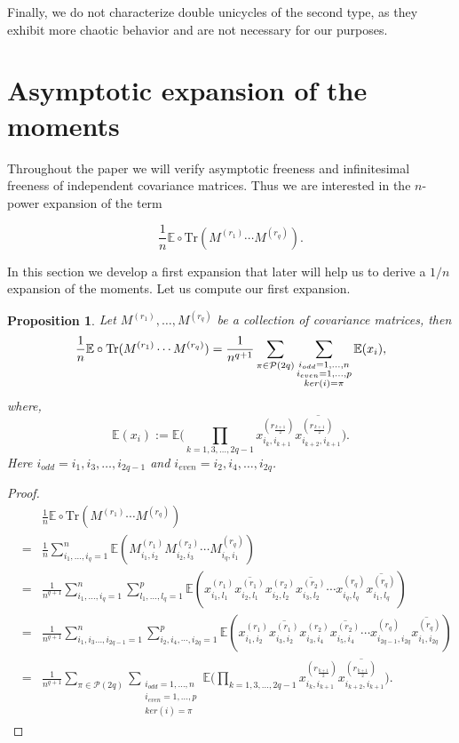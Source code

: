 \documentclass{article}
\newtheorem{proposition}[theorem]{Proposition}
\theoremstyle{definition}
\newcommand{\E}{\mathbb{E}}
\newcommand{\cP}{\mathcal{P}}
\newcommand{\Tr}{\text{Tr}}
\begin{document}
{Finally, we do not characterize double unicycles of the second type, as they exhibit more chaotic behavior and are not necessary for our purposes.

\section{Asymptotic expansion of the moments}\label{Section: Asymptotic expansion of the moments}

Throughout the paper we will verify asymptotic freeness and infinitesimal freeness of independent covariance matrices. Thus we are interested in the $n$-power expansion of the term

$$\frac{1}{n} \E \circ \Tr(M^{(r_1)}\cdots M^{(r_q)}).$$

In this section we develop a first expansion that later will help us to derive a $1/n$ expansion of the moments. Let us compute our first expansion.

\begin{proposition}\label{Proposition: Expansion of moments 1}
Let $M^{(r_1)},\dots,M^{(r_q)}$ be a collection of covariance matrices, then
\begin{equation}
\frac{1}{n} \E \circ \textup{\Tr}(M^{(r_1)}\cdots M^{(r_q)})=\frac{1}{n^{q+1}}\sum_{\pi\in \cP(2q)}\sum_{\substack{i_{odd}=1,\dots,n \\ i_{even}=1,\dots,p \\ ker(i)=\pi}}\E(x_i),
\end{equation}
where,
$$\E(x_i) := \E\Bigg(\prod_{k=1,3,\dots,2q-1}x_{i_k,i_{k+1}}^{(r_{\frac{k+1}{2}})}\overline{x_{i_{k+2},i_{k+1}}^{(r_{\frac{k+1}{2}})}}\Bigg).$$
Here $i_{odd}=i_1,i_3,\dots,i_{2q-1}$ and $i_{even}=i_2,i_4,\dots,i_{2q}$.
\end{proposition}
\begin{proof}
\begin{eqnarray*}
&&\frac{1}{n} \E \circ \Tr(M^{(r_1)}\cdots M^{(r_q)}) \\
&=& \frac{1}{n} \sum_{i_1,\dots ,i_q=1}^n \E(M^{(r_1)}_{i_1,i_2}M^{(r_2)}_{i_2,i_3}\cdots M^{(r_q)}_{i_q,i_1}) \\
&=& \frac{1}{n^{q+1}}\sum_{i_1,\dots,i_q=1}^n \sum_{l
_1,\dots,l_q=1}^p \E(x_{i_1,l_1}^{(r_1)}\overline{x_{i_2,l_1}^{(r_1)}}x_{i_2,l_2}^{(r_2)}\overline{x_{i_3,l_2}^{(r_2)}}\cdots x_{i_q,l_q}^{(r_q)}\overline{x_{i_1,l_q}^{(r_q)}}) \\
&=& \frac{1}{n^{q+1}}\sum_{i_1,i_3\dots,i_{2q-1}=1}^n \sum_{i_2,i_4,\cdots,i_{2q}=1}^p \E(x_{i_1,i_2}^{(r_1)}\overline{x_{i_3,i_2}^{(r_1)}}x_{i_3,i_4}^{(r_2)}\overline{x_{i_5,i_4}^{(r_2)}}\cdots x_{i_{2q-1},i_{2q}}^{(r_q)}\overline{x_{i_1,i_{2q}}^{(r_q)}}) \\
&=& \frac{1}{n^{q+1}}\sum_{\pi\in \cP(2q)}\sum_{\substack{i_{odd}=1,\dots,n \\ i_{even}=1,\dots,p \\ ker(i)=\pi}}\E\Bigg(\prod_{k=1,3,\dots,2q-1}x_{i_k,i_{k+1}}^{(r_{\frac{k+1}{2}})}\overline{x_{i_{k+2},i_{k+1}}^{(r_{\frac{k+1}{2}})}}\Bigg).
\end{eqnarray*}
\end{proof}

}
\end{document}
